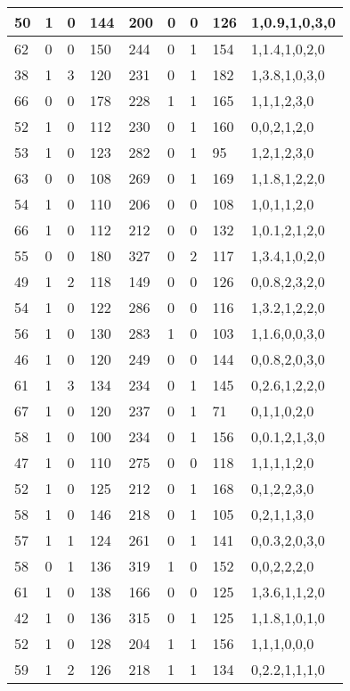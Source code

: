 \documentclass{article}
\begin{document}
\begin{table}[h!]
\begin{tabular}{|l|l|l|l|l|l|l|l|l|}
50 & 1 & 0 & 144 & 200 & 0 & 0 & 126 & 1,0.9,1,0,3,0 \\ \hline
62 & 0 & 0 & 150 & 244 & 0 & 1 & 154 & 1,1.4,1,0,2,0 \\ \hline
38 & 1 & 3 & 120 & 231 & 0 & 1 & 182 & 1,3.8,1,0,3,0 \\ \hline
66 & 0 & 0 & 178 & 228 & 1 & 1 & 165 & 1,1,1,2,3,0 \\ \hline
52 & 1 & 0 & 112 & 230 & 0 & 1 & 160 & 0,0,2,1,2,0 \\ \hline
53 & 1 & 0 & 123 & 282 & 0 & 1 & 95 & 1,2,1,2,3,0 \\ \hline
63 & 0 & 0 & 108 & 269 & 0 & 1 & 169 & 1,1.8,1,2,2,0 \\ \hline
54 & 1 & 0 & 110 & 206 & 0 & 0 & 108 & 1,0,1,1,2,0 \\ \hline
66 & 1 & 0 & 112 & 212 & 0 & 0 & 132 & 1,0.1,2,1,2,0 \\ \hline
55 & 0 & 0 & 180 & 327 & 0 & 2 & 117 & 1,3.4,1,0,2,0 \\ \hline
49 & 1 & 2 & 118 & 149 & 0 & 0 & 126 & 0,0.8,2,3,2,0 \\ \hline
54 & 1 & 0 & 122 & 286 & 0 & 0 & 116 & 1,3.2,1,2,2,0 \\ \hline
56 & 1 & 0 & 130 & 283 & 1 & 0 & 103 & 1,1.6,0,0,3,0 \\ \hline
46 & 1 & 0 & 120 & 249 & 0 & 0 & 144 & 0,0.8,2,0,3,0 \\ \hline
61 & 1 & 3 & 134 & 234 & 0 & 1 & 145 & 0,2.6,1,2,2,0 \\ \hline
67 & 1 & 0 & 120 & 237 & 0 & 1 & 71 & 0,1,1,0,2,0 \\ \hline
58 & 1 & 0 & 100 & 234 & 0 & 1 & 156 & 0,0.1,2,1,3,0 \\ \hline
47 & 1 & 0 & 110 & 275 & 0 & 0 & 118 & 1,1,1,1,2,0 \\ \hline
52 & 1 & 0 & 125 & 212 & 0 & 1 & 168 & 0,1,2,2,3,0 \\ \hline
58 & 1 & 0 & 146 & 218 & 0 & 1 & 105 & 0,2,1,1,3,0 \\ \hline
57 & 1 & 1 & 124 & 261 & 0 & 1 & 141 & 0,0.3,2,0,3,0 \\ \hline
58 & 0 & 1 & 136 & 319 & 1 & 0 & 152 & 0,0,2,2,2,0 \\ \hline
61 & 1 & 0 & 138 & 166 & 0 & 0 & 125 & 1,3.6,1,1,2,0 \\ \hline
42 & 1 & 0 & 136 & 315 & 0 & 1 & 125 & 1,1.8,1,0,1,0 \\ \hline
52 & 1 & 0 & 128 & 204 & 1 & 1 & 156 & 1,1,1,0,0,0 \\ \hline
59 & 1 & 2 & 126 & 218 & 1 & 1 & 134 & 0,2.2,1,1,1,0 \\ \hline

\end{tabular}
\end{table}
\end{document}
